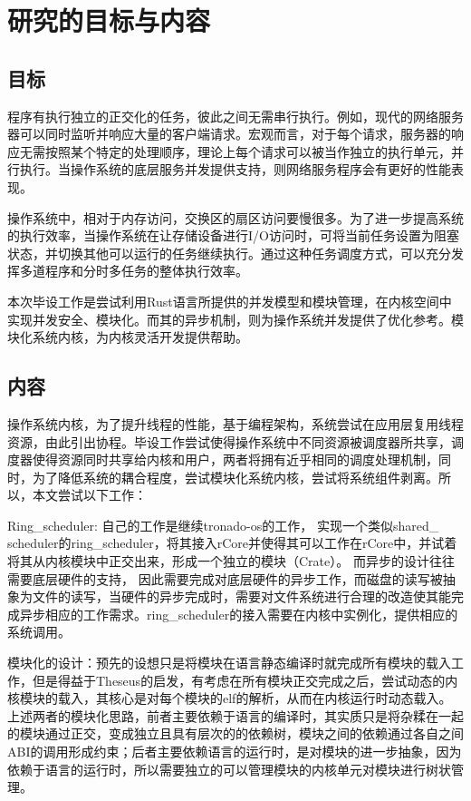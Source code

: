 \section{研究的目标与内容}

\subsection{目标}

程序有执行独立的正交化的任务，彼此之间无需串行执行。例如，现代的网络服务器可以同时监听并响应大量的客户端请求。宏观而言，对于每个请求，服务器的响应无需按照某个特定的处理顺序，理论上每个请求可以被当作独立的执行单元，并行执行。当操作系统的底层服务并发提供支持，则网络服务程序会有更好的性能表现。

操作系统中，相对于内存访问，交换区的扇区访问要慢很多。为了进一步提高系统的执行效率，当操作系统在让存储设备进行I/O访问时，可将当前任务设置为阻塞状态，并切换其他可以运行的任务继续执行。通过这种任务调度方式，可以充分发挥多道程序和分时多任务的整体执行效率。

本次毕设工作是尝试利用Rust语言所提供的并发模型和模块管理，在内核空间中实现并发安全、模块化。而其的异步机制，则为操作系统并发提供了优化参考。模块化系统内核，为内核灵活开发提供帮助。
\subsection{内容}

操作系统内核，为了提升线程的性能，基于编程架构，系统尝试在应用层复用线程资源，由此引出协程。毕设工作尝试使得操作系统中不同资源被调度器所共享，调度器使得资源同时共享给内核和用户，两者将拥有近乎相同的调度处理机制，同时，为了降低系统的耦合程度，尝试模块化系统内核，尝试将系统组件剥离。所以，本文尝试以下工作：

Ring\_scheduler: 自己的工作是继续tronado-os的工作， 实现一个类似shared\_ scheduler的ring\_scheduler，将其接入rCore并使得其可以工作在rCore中，并试着将其从内核模块中正交出来，形成一个独立的模块（Crate）。 而异步的设计往往需要底层硬件的支持， 因此需要完成对底层硬件的异步工作，而磁盘的读写被抽象为文件的读写，当硬件的异步完成时，需要对文件系统进行合理的改造使其能完成异步相应的工作需求。ring\_scheduler的接入需要在内核中实例化，提供相应的系统调用。

模块化的设计：预先的设想只是将模块在语言静态编译时就完成所有模块的载入工作，但是得益于Theseus的启发，有考虑在所有模块正交完成之后，尝试动态的内核模块的载入，其核心是对每个模块的elf的解析，从而在内核运行时动态载入。上述两者的模块化思路，前者主要依赖于语言的编译时，其实质只是将杂糅在一起的模块通过正交，变成独立且具有层次的的依赖树，模块之间的依赖通过各自之间ABI的调用形成约束；后者主要依赖语言的运行时，是对模块的进一步抽象，因为依赖于语言的运行时，所以需要独立的可以管理模块的内核单元对模块进行树状管理。


